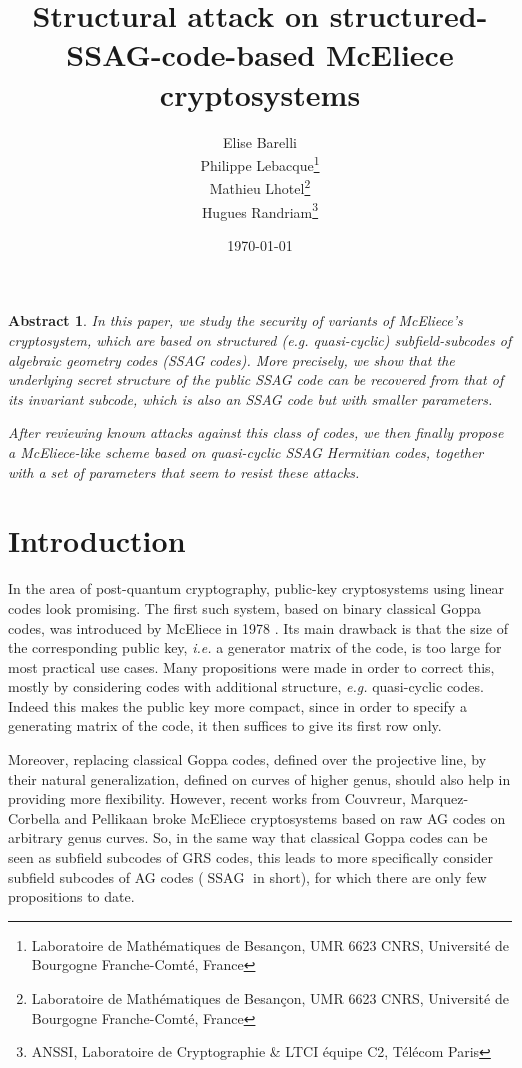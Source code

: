 \documentclass[10pt]{article}
\title{Structural attack on structured-SSAG-code-based McEliece cryptosystems}
\author{
Elise Barelli\\
Philippe Lebacque\footnote{Laboratoire de Mathématiques de Besançon, UMR 6623 CNRS, Université de Bourgogne Franche-Comté, France}\\
Mathieu Lhotel\footnote{Laboratoire de Mathématiques de Besançon, UMR 6623 CNRS, Université de Bourgogne Franche-Comté, France}\\
Hugues Randriam\footnote{ANSSI, Laboratoire de Cryptographie \& LTCI équipe C2, Télécom Paris}
}
\date{\today}
\newtheorem*{abs}{Abstract}
\theoremstyle{definition}
\theoremstyle{definition}
\theoremstyle{definition}
\newcommand{\ssag}{\operatorname{SSAG}}
\begin{document}
\maketitle

\begin{abs} 
  In this paper, we study the security of variants of McEliece's cryptosystem, which are based on structured (\textit{e.g.} quasi-cyclic) subfield-subcodes of algebraic geometry codes (SSAG codes).
  More precisely, we show that the underlying secret structure of the public SSAG code can be recovered from that of its invariant subcode, which is also an SSAG code but with smaller parameters.
  
  After reviewing known attacks against this class of codes, we then finally propose a McEliece-like scheme based on quasi-cyclic SSAG Hermitian codes, together with a set of parameters that seem to resist these attacks.
\end{abs}

\newpage


\section{Introduction}


In the area of post-quantum cryptography, public-key cryptosystems using linear codes look promising. The first such system, based on binary classical Goppa codes, was introduced by McEliece in 1978 \cite{McE}. Its main drawback is that the size of the corresponding public key, \textit{i.e.} a generator matrix of the code, is too large for most practical use cases. Many propositions were made in order to correct this, mostly by considering codes with additional structure, \textit{e.g.} quasi-cyclic codes.
Indeed this makes the public key more compact, since in order to specify a generating matrix of the code, it then suffices to give its first row only.

\vspace*{0.2cm}

\noindent Moreover, replacing classical Goppa codes, defined over the projective line, by their natural generalization, defined on curves of higher genus, should also help in providing more flexibility. 
However, recent works from Couvreur, Marquez-Corbella and Pellikaan \cite{CMP} broke McEliece cryptosystems based on raw AG codes on arbitrary genus curves. So, in the same way that classical Goppa codes can be seen as subfield subcodes of GRS codes, this leads to more specifically consider subfield subcodes of AG codes ($\ssag$ in short), for which there are only few propositions to date. 
\end{document}
